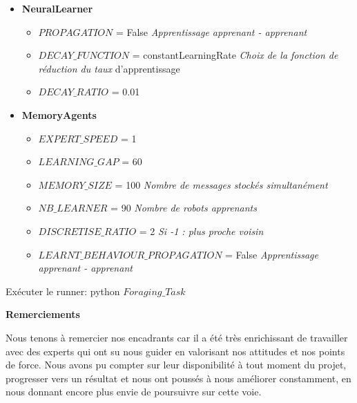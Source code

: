\documentclass[a4paper, 12pt]{report}
\begin{document}
\begin{itemize}
\item{\textbf{NeuralLearner}}
	\begin{itemize}
		\item{$PROPAGATION$ = False					\textit{Apprentissage apprenant - apprenant}}
		\item{$DECAY\_FUNCTION$ = constantLearningRate	\textit{Choix de la fonction de réduction du taux} d'apprentissage}
		\item{$DECAY\_RATIO$ = 0.01}
	\end{itemize}

\item{\textbf{MemoryAgents}}
	\begin{itemize}
		\item{$EXPERT\_SPEED$ = 1}
		\item{$LEARNING\_GAP$ = 60}										
		\item{$MEMORY\_SIZE$ = 100					\textit{Nombre de messages stockés simultanément}}
		\item{$NB\_LEARNER$ = 90						\textit{Nombre de robots apprenants}}
		\item{$DISCRETISE\_RATIO$ = 2                \textit{Si -1 : plus proche voisin}}
		\item{$LEARNT\_BEHAVIOUR\_PROPAGATION$ = False \textit{Apprentissage apprenant - apprenant}}
	\end{itemize}
\end{itemize}
Exécuter le runner:
python $Foraging\_Task$

\newpage
\Large{\textbf{Remerciements}}

    Nous tenons à remercier nos encadrants car il a été très enrichissant de travailler avec des experts qui ont su nous guider en valorisant nos attitudes et nos points de force. Nous avons pu compter sur leur disponibilité à tout moment du projet, progresser vers un résultat et nous ont poussés à nous améliorer constamment, en nous donnant encore plus envie de poursuivre sur cette voie.
\end{document}
